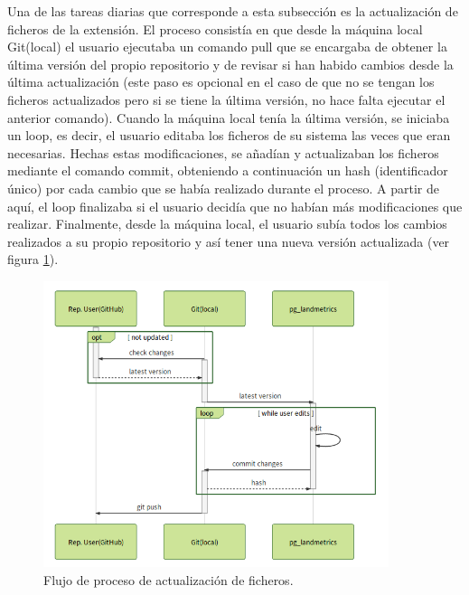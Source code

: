 Una de las tareas diarias que corresponde a esta subsección es la actualización de ficheros de la extensión. El proceso consistía en que desde la máquina local Git(local) el usuario ejecutaba un comando pull que se encargaba de obtener la última versión del propio repositorio y de revisar si han habido cambios desde la última actualización (este paso es opcional en el caso de que no se tengan los ficheros actualizados pero si se tiene la última versión, no hace falta ejecutar el anterior comando). Cuando la máquina local tenía la última versión, se iniciaba un loop, es decir, el usuario editaba los ficheros de su sistema las veces que eran necesarias. Hechas estas modificaciones, se añadían y actualizaban los ficheros mediante el comando commit, obteniendo a continuación un hash (identificador único) por cada cambio que se había realizado durante el proceso. A partir de aquí, el loop finalizaba si el usuario decidía que no habían más modificaciones que realizar. Finalmente, desde la máquina local, el usuario subía todos los cambios realizados a su propio repositorio y así tener una nueva versión actualizada (ver figura \ref{fig:diary}).


\begin{figure}
\begin{center}
\includegraphics[width=0.9\textwidth]{Metodologia/Figs/diary.png}
\caption{Flujo de proceso de actualización de ficheros. \label{fig:diary}}
\end{center}
\end{figure}

